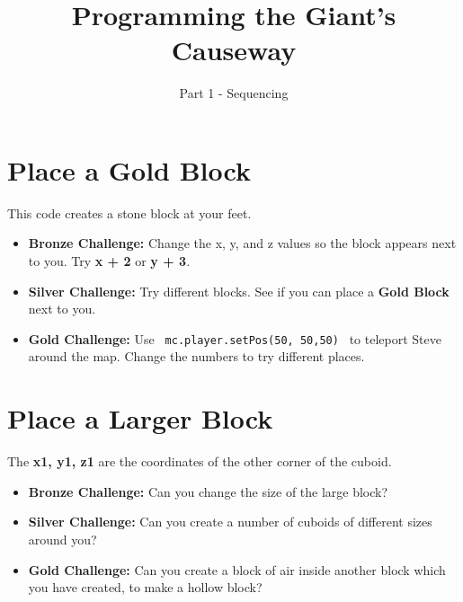 \documentclass{geocraft-worksheet}
\begin{document}
\title{Programming the Giant's Causeway}
\subtitle{Part 1 - Sequencing}

\date{}

\maketitle


\section{Place a Gold Block}
\lstset{language=Python}\vspace{-0.5cm}

\noindent%
%
\vspace{0.2cm}
%
%
\vspace{0.2cm}

\noindent This code creates a stone block at your feet.

\begin{itemize}
\item\textbf{Bronze Challenge:} Change the x, y, and z values so the block
appears next to you. \newline Try \textbf{x + 2} or \textbf{y + 3}. 

\item\textbf{Silver Challenge:} Try different blocks. See if you can
  place a \textbf{Gold Block} next to you. 

\item\textbf{Gold Challenge:} Use
\lstinline{ mc.player.setPos(50, 50,50) }
 to teleport Steve around the map. Change the numbers to try
  different places.
\end{itemize}

\section{Place a Larger Block}\vspace{-0.5cm}

\noindent%
%
\vspace{0.2cm}
%
%
\vspace{0.5cm}

\noindent The \textbf{x1, y1, z1} are the coordinates of the other corner of the
cuboid. 

\begin{itemize}
\item\textbf{Bronze Challenge:} Can you change the size of the large block?

\item\textbf{Silver Challenge:} Can you create a number of cuboids of
  different sizes around you?

\item\textbf{Gold Challenge:} Can you create a block of air inside
  another block which you have created, to make a hollow block?
\end{itemize}
\end{document}

